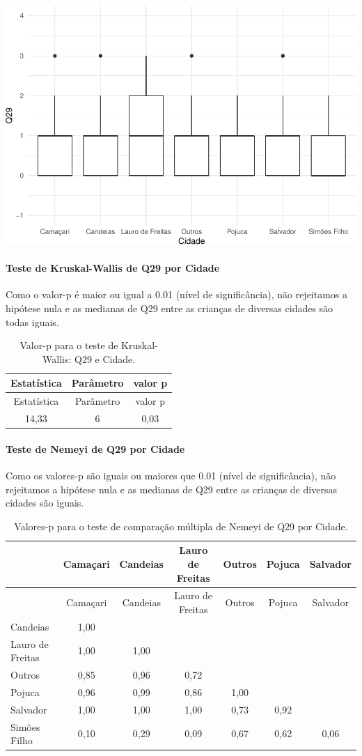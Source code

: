 \documentclass[]{article}
\let\oldparagraph\paragraph
\renewcommand{\paragraph}[1]{\oldparagraph{#1}\mbox{}}
\begin{document}
\begin{center}\includegraphics[width=0.75\linewidth]{relatorio_covid19_files/figure-latex/unnamed-chunk-903-1} \end{center}

\hypertarget{teste-de-kruskal-wallis-de-q29-por-cidade}{%
\paragraph{Teste de Kruskal-Wallis de Q29 por Cidade}\label{teste-de-kruskal-wallis-de-q29-por-cidade}}

Como o valor-p é maior ou igual a 0.01 (nível de significância), não rejeitamos a hipótese nula e as medianas de Q29 entre as crianças de diversas cidades são todas iguais.

\begin{longtable}[]{@{}ccc@{}}
\caption{\label{tab:unnamed-chunk-905}Valor-p para o teste de Kruskal-Wallis: Q29 e Cidade.}\tabularnewline
\toprule
Estatística & Parâmetro & valor p\tabularnewline
\midrule
\endfirsthead
\toprule
Estatística & Parâmetro & valor p\tabularnewline
\midrule
\endhead
14,33 & 6 & 0,03\tabularnewline
\bottomrule
\end{longtable}

\hypertarget{teste-de-nemeyi-de-q29-por-cidade}{%
\paragraph{Teste de Nemeyi de Q29 por Cidade}\label{teste-de-nemeyi-de-q29-por-cidade}}

Como os valores-p são iguais ou maiores que 0.01 (nível de significância), não rejeitamos a hipótese nula e as medianas de Q29 entre as crianças de diversas cidades são iguais.

\begin{longtable}[]{@{}lcccccc@{}}
\caption{\label{tab:unnamed-chunk-907}Valores-p para o teste de comparação múltipla de Nemeyi de Q29 por Cidade.}\tabularnewline
\toprule
& Camaçari & Candeias & Lauro de Freitas & Outros & Pojuca & Salvador\tabularnewline
\midrule
\endfirsthead
\toprule
& Camaçari & Candeias & Lauro de Freitas & Outros & Pojuca & Salvador\tabularnewline
\midrule
\endhead
Candeias & 1,00 & & & & &\tabularnewline
Lauro de Freitas & 1,00 & 1,00 & & & &\tabularnewline
Outros & 0,85 & 0,96 & 0,72 & & &\tabularnewline
Pojuca & 0,96 & 0,99 & 0,86 & 1,00 & &\tabularnewline
Salvador & 1,00 & 1,00 & 1,00 & 0,73 & 0,92 &\tabularnewline
Simões Filho & 0,10 & 0,29 & 0,09 & 0,67 & 0,62 & 0,06\tabularnewline
\bottomrule
\end{longtable}
\end{document}
